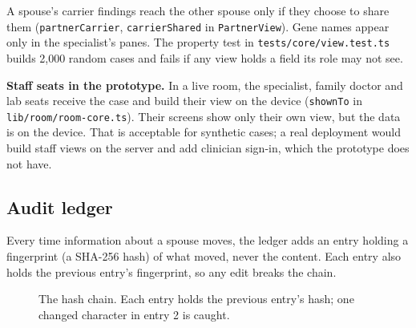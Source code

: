 \documentclass[10.5pt,a4paper]{article}
\newcommand{\code}[1]{\texttt{\small #1}}
\newcommand{\file}[1]{\leavevmode\textcolor{muted}{\texttt{\small #1}}}
\begin{document}
A spouse's carrier findings reach the other spouse only if they choose to share them (\code{partnerCarrier},
\code{carrierShared} in \code{PartnerView}). Gene names appear only in the specialist's panes. The property test in
\file{tests/core/view.test.ts} builds 2,000 random cases and fails if any view holds a field its role may not see.

\textbf{Staff seats in the prototype.} In a live room, the specialist, family doctor and lab seats receive the case and
build their view on the device (\code{shownTo} in \file{lib/room/room-core.ts}). Their screens show only their own
view, but the data is on the device. That is acceptable for synthetic cases; a real deployment would build staff views
on the server and add clinician sign-in, which the prototype does not have.

\subsection{Audit ledger}

Every time information about a spouse moves, the ledger adds an entry holding a fingerprint (a SHA-256 hash) of what
moved, never the content. Each entry also holds the previous entry's fingerprint, so any edit breaks the chain.

\begin{figure}[!htbp]
\centering
{}
\caption{The hash chain. Each entry holds the previous entry's hash; one changed character in entry 2 is caught.}
\end{figure}
\end{document}
